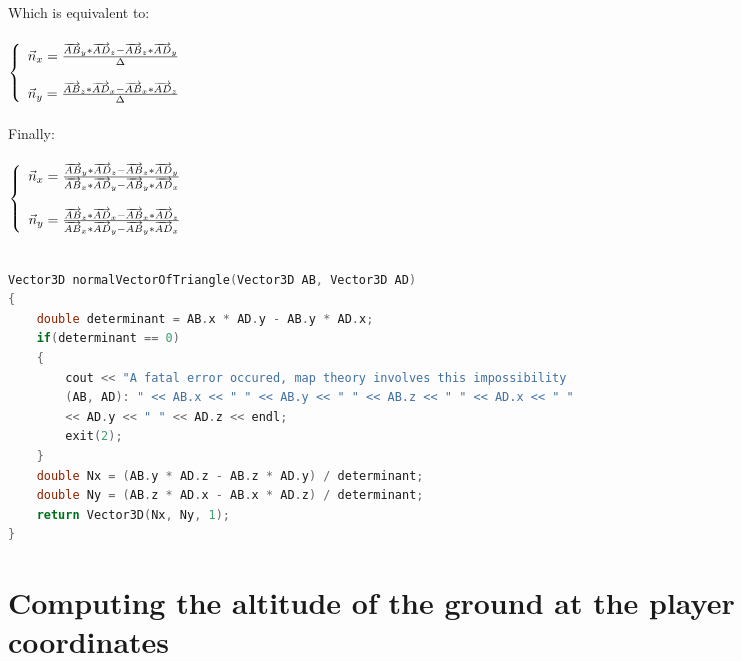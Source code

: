 \documentclass{article}
\begin{document}
			Which is equivalent to:\\\\
			
			$\left\{\begin{array}{r c l}
				\vec{n}_x = \frac{\overrightarrow{AB}_y * \overrightarrow{AD}_z - \overrightarrow{AB}_z * \overrightarrow{AD}_y}{\Delta}\\\\
				\vec{n}_y = \frac{\overrightarrow{AB}_z * \overrightarrow{AD}_x - \overrightarrow{AB}_x * \overrightarrow{AD}_z}{\Delta}
			\end{array}\right.$\\\\
			
			Finally:\\\\
			
			$\left\{\begin{array}{r c l}
				\vec{n}_x = \frac{\overrightarrow{AB}_y * \overrightarrow{AD}_z - \overrightarrow{AB}_z * \overrightarrow{AD}_y}{\overrightarrow{AB}_x * \overrightarrow{AD}_y - \overrightarrow{AB}_y * \overrightarrow{AD}_x}\\\\
				\vec{n}_y = \frac{\overrightarrow{AB}_z * \overrightarrow{AD}_x - \overrightarrow{AB}_x * \overrightarrow{AD}_z}{\overrightarrow{AB}_x * \overrightarrow{AD}_y - \overrightarrow{AB}_y * \overrightarrow{AD}_x}
			\end{array}\right.$\\\\
			
			\begin{lstlisting}[language=C++, caption={Here is the implementation in C++ to compute $\vec{n}$}]
Vector3D normalVectorOfTriangle(Vector3D AB, Vector3D AD)
{
	double determinant = AB.x * AD.y - AB.y * AD.x;
	if(determinant == 0)
	{
		cout << "A fatal error occured, map theory involves this impossibility
		(AB, AD): " << AB.x << " " << AB.y << " " << AB.z << " " << AD.x << " "
		<< AD.y << " " << AD.z << endl;
		exit(2);
	}
	double Nx = (AB.y * AD.z - AB.z * AD.y) / determinant;
	double Ny = (AB.z * AD.x - AB.x * AD.z) / determinant;
	return Vector3D(Nx, Ny, 1);
}
			\end{lstlisting}

	\section{Computing the altitude of the ground at the player coordinates}
	
\end{document}
